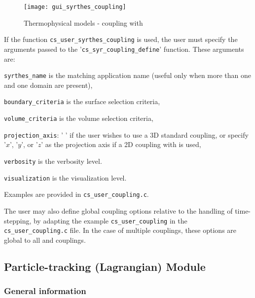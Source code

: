 {{{\begin{figure}[ht]
\begin{center}
\texttt{[image: gui\_syrthes\_coupling]}
\caption{Thermophysical models - coupling with \syrthes}
\label{fig:syrthes}
\end{center}
\end{figure}

If the function \texttt{cs\_user\_syrthes\_coupling} is used, the user must
specify the arguments passed to the '\texttt{cs\_syr\_coupling\_define}' function.
 These arguments are:
\begin{list}{-}{}
 \item \texttt{syrthes\_name} is the matching \syrthes application name (useful only when more than one \syrthes and one \CS domain are present),
 \item \texttt{boundary\_criteria} is the surface selection criteria,
 \item \texttt{volume\_criteria} is the volume selection criteria,
 \item \texttt{projection\_axis}: ' ' if the user wishes to use a 3D standard coupling,
 or specify '$x$', '$y$', or '$z$' as the projection axis if a 2D coupling with \syrthes is used,
 \item \texttt{verbosity} is the verbosity level.
 \item \texttt{visualization} is the visualization level.
\end{list}
Examples are provided in \texttt{cs\_user\_coupling.c}.

The user may also define global coupling options relative to the handling of
time-stepping, by adapting the example \texttt{cs\_user\_coupling}
in the \texttt{cs\_user\_coupling.c} file. In the case of multiple couplings,
these options are global to all \syrthes and \CS couplings.

\subsection{Particle-tracking (Lagrangian) Module}

\subsubsection{General information}\label{sec:over-lag}

\begin{itemize}


\end{itemize}}}}
